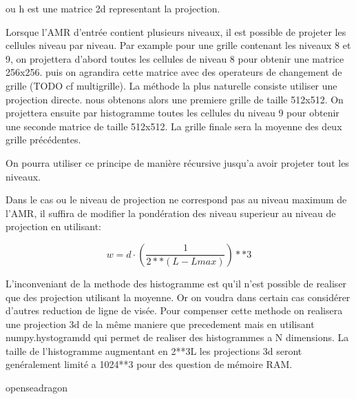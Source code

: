 ou h est une matrice 2d representant la projection.


Lorsque l'AMR d'entrée contient plusieurs niveaux, il est possible de projeter les cellules niveau par niveau.
Par example pour une grille contenant les niveaux 8 et 9, on projettera d'abord toutes les cellules de niveau 8 pour obtenir une matrice 256x256.
puis on agrandira cette matrice avec des operateurs de changement de grille (TODO cf multigrille).
La méthode la plus naturelle consiste utiliser une projection directe.
nous obtenons alors une premiere grille de taille 512x512.
On projettera ensuite par histogramme toutes les cellules du niveau  9 pour obtenir une seconde matrice de taille 512x512.
La grille finale sera la moyenne des deux grille précédentes.

On pourra utiliser ce principe de manière récursive jusqu'a avoir projeter tout les niveaux.

Dans le cas ou le niveau de projection ne correspond pas au niveau maximum de l'AMR, il suffira de modifier la pondération des niveau superieur au niveau de projection en utilisant:

\begin{equation}
w = d \cdot \left( \frac{1}{2**(L-Lmax) }\right) **3
\end{equation}



L'inconveniant de la methode des histogramme est qu'il n'est possible de realiser que des projection utilisant la moyenne.
Or on voudra dans certain cas considérer d'autres reduction de ligne de visée.
Pour compenser cette methode on realisera une projection 3d de la même maniere que precedement mais en utilisant numpy.hystogramdd qui permet de realiser des histogrammes a N dimensions.
La taille de l'histogramme augmentant en 2**3L les projections 3d seront genéralement limité a 1024**3 pour des question de mémoire RAM. 





openseadragon
%






